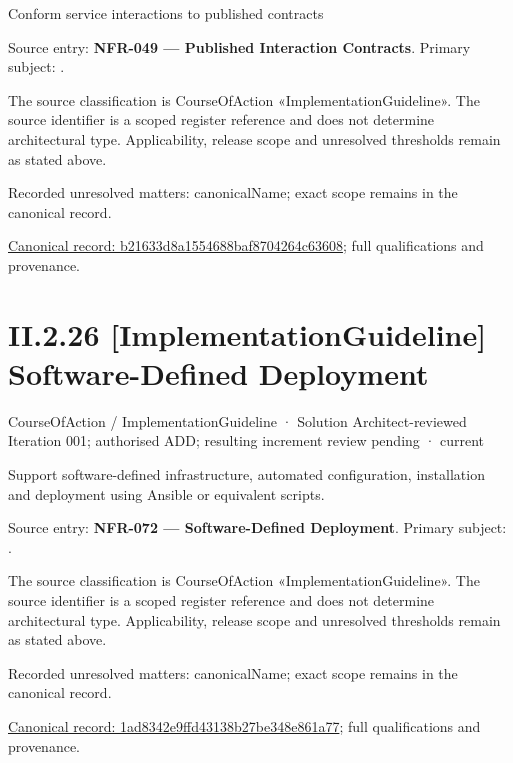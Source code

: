 Conform service interactions to published contracts



Source entry: \textbf{NFR-049 — Published Interaction Contracts}. Primary subject: \texttt{}.



The source classification is CourseOfAction «ImplementationGuideline». The source identifier is a scoped register reference and does not determine architectural type. Applicability, release scope and unresolved thresholds remain as stated above.


{\small Recorded unresolved matters: canonicalName; exact scope remains in the canonical record.}\par
{\footnotesize \href{../../../../continuum/strategy/course-of-action/implementation-guideline/b21633d8a1554688baf8704264c63608.md}{Canonical record: b21633d8a1554688baf8704264c63608}; full qualifications and provenance.}\par
\section*{II.2.26 [ImplementationGuideline] Software-Defined Deployment}
\label{navigation:II.2.26}

\label{element:1ad8342e9ffd43138b27be348e861a77}
{\small CourseOfAction / ImplementationGuideline · Solution Architect-reviewed Iteration 001; authorised ADD; resulting increment review pending · current}\par

Support software-defined infrastructure, automated configuration, installation and deployment using Ansible or equivalent scripts.



Source entry: \textbf{NFR-072 — Software-Defined Deployment}. Primary subject: \texttt{}.



The source classification is CourseOfAction «ImplementationGuideline». The source identifier is a scoped register reference and does not determine architectural type. Applicability, release scope and unresolved thresholds remain as stated above.


{\small Recorded unresolved matters: canonicalName; exact scope remains in the canonical record.}\par
{\footnotesize \href{../../../../continuum/strategy/course-of-action/implementation-guideline/1ad8342e9ffd43138b27be348e861a77.md}{Canonical record: 1ad8342e9ffd43138b27be348e861a77}; full qualifications and provenance.}\par
